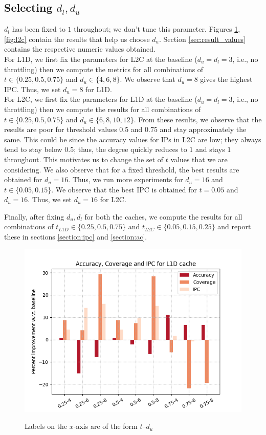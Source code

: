 \documentclass[11pt, swedish, openany]{book}
\begin{document}
\subsection{Selecting $d_l, d_u$}
$d_l$ has been fixed to $1$ throughout; we don't tune this parameter. Figures \ref{fig:l1d}, \ref{fig:l2c} contain the results that help us choose $d_u$. Section \ref{sec:result_values} contains the respective numeric values obtained.\\
For L1D, we first fix the parameters for L2C at the baseline ($d_u = d_l = 3$, i.e., no throttling) then we compute the metrics for all combinations of $t \in \{0.25, 0.5, 0.75\}$ and $d_u \in \{4, 6, 8\}$. We observe that $d_u = 8$ gives the highest IPC. Thus, we set $d_u = 8$ for L1D.\\
For L2C, we first fix the parameters for L1D at the baseline ($d_u = d_l = 3$, i.e., no throttling) then we compute the results for all combinations of $t \in \{0.25, 0.5, 0.75\}$ and $d_u \in \{6, 8, 10, 12\}$. From these results, we observe that the results are poor for threshold values 0.5 and 0.75 and stay approximately the same. This could be since the accuracy values for IPs in L2C are low; they always tend to stay below $0.5$; thus, the degree quickly reduces to $1$ and stays $1$ throughout. This motivates us to change the set of $t$ values that we are considering. We also observe that for a fixed threshold, the best results are obtained for $d_u = 16$. Thus, we run more experiments for $d_u = 16$ and $t \in \{0.05, 0.15\}$. We observe that the best IPC is obtained for $t = 0.05$ and $d_u = 16$. Thus, we set $d_u = 16$ for L2C.

\medskip
Finally, after fixing $d_u, d_l$ for both the caches, we compute the results for all combinations of $t_{L1D} \in \{0.25, 0.5, 0.75\}$ and $t_{L2C} \in \{0.05, 0.15, 0.25\}$ and report these in sections \ref{section:ipc} and \ref{section:ac}.

\begin{figure}[H]
    \centering
    {\includegraphics[scale = 0.65]{images/L1D.png}}
    \caption{Labels on the $x$-axis are of the form $t$--$d_u$}
    \label{fig:l1d}
\end{figure}
\end{document}
